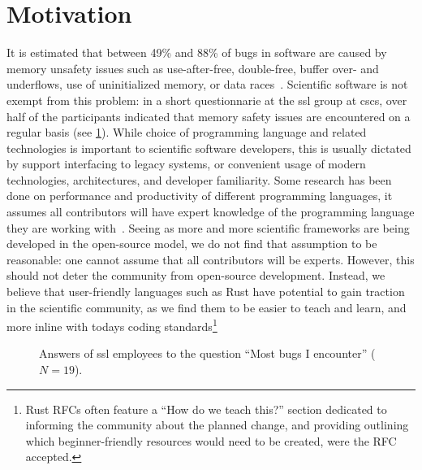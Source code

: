 \documentclass[british]{scrreprt}
\begin{document}
\section{Motivation}
It is estimated that between 49\% and 88\% of bugs in software are caused by memory unsafety issues such as use-after-free, double-free, buffer over- and underflows, use of uninitialized memory, or data races~\cite{GaynorWritingLinuxKernel2019}. Scientific software is not exempt from this problem: in a short questionnarie at the \gls{ssl} group at \gls{cscs}, over half of the participants indicated that memory safety issues are encountered on a regular basis (see \cref{fig:bugs}). While choice of programming language and related technologies is important to scientific software developers, this is usually dictated by support interfacing to legacy systems, or convenient usage of modern technologies, architectures, and developer familiarity. Some research has been done on performance and productivity of different programming languages, it assumes all contributors will have expert knowledge of the programming language they are working with~\cite{ChristadlerPerformanceProductivityNew2012}. Seeing as more and more scientific frameworks are being developed in the open-source model, we do not find that assumption to be reasonable: one cannot assume that all contributors will be experts. However, this should not deter the community from open-source development. Instead, we believe that user-friendly languages such as Rust have potential to gain traction in the scientific community, as we find them to be easier to teach and learn, and more inline with todays coding standards\footnote{Rust RFCs often feature a \enquote{How do we teach this?} section dedicated to informing the community about the planned change, and providing outlining which beginner-friendly resources would need to be created, were the RFC accepted.}


\begin{figure}
	\caption{Answers of \gls{ssl} employees to the question \enquote{Most bugs I encounter\textellipsis} (\( N = 19 \)).}
	\label{fig:bugs}
\end{figure}
\end{document}
